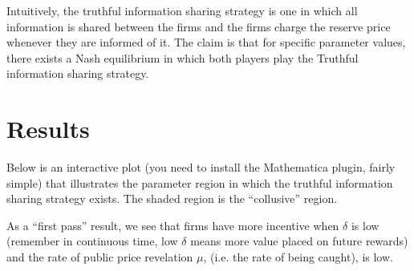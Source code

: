 \documentclass{article}
\begin{document}
Intuitively, the truthful information sharing strategy is one in which
all information is shared between the firms and the firms charge the
reserve price whenever they are informed of it.  The claim is that for
specific parameter values, there exists a Nash equilibrium in which
both players play the Truthful information sharing strategy.  

\section{Results}
Below is an interactive plot (you need to install the Mathematica
plugin, fairly simple) that illustrates the parameter region in which
the truthful information sharing strategy exists.  The shaded region
is the ``collusive'' region.


As a ``first pass'' result, we see that firms have more incentive when
$\delta$ is low (remember in continuous time, low $\delta$ means more
value placed on future rewards) and the rate of public price
revelation $\mu$, (i.e. the rate of being caught), is low.







\end{document}
